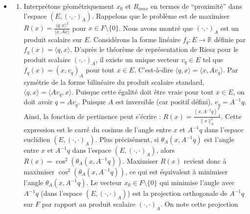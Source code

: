 \documentclass[11pt,a4paper]{report}
\begin{document}
\begin{enumerate}
\begin{itemize}
\begin{enumerate}
    \item
      Calculons la valeur maximale \(R_{max}\) de \(R(x)\). La valeur
      maximale de \(R'(y)\) est \(\|P_{F'}(q')\|^2\). Donc,
      \(R_{max} = \|P_{F'}(q')\|^2\). En substituant \(q' = A^{-1/2}q\)
      et \(F' = A^{1/2}(F)\) :
      \(R_{max} = \|P_{A^{1/2}(F)}(A^{-1/2}q)\|^2\).
    \end{enumerate}
  \item
    \begin{enumerate}
    \def\labelenumii{\alph{enumii})}
    \setcounter{enumii}{3}

    \item
      Interprétons géométriquement \(x_0\) et \(R_{max}\) en termes de
      ``proximité'' dans l'espace \((E, (\cdot, \cdot)_A)\). Rappelons
      que le problème est de maximiser
      \(R(x) = \frac{\langle q, x \rangle^2}{\langle x, Ax \rangle}\)
      pour \(x \in F \setminus \{0\}\). Nous avons montré que
      \((\cdot, \cdot)_A\) est un produit scalaire sur \(E\).
      Considérons la forme linéaire \(f_q: E \to \mathbb{R}\) définie
      par \(f_q(x) = \langle q, x \rangle\). D'après le théorème de
      représentation de Riesz pour le produit scalaire
      \((\cdot, \cdot)_A\), il existe un unique vecteur \(v_q \in E\)
      tel que \(f_q(x) = (x, v_q)_A\) pour tout \(x \in E\).
      C'est-à-dire \(\langle q, x \rangle = \langle x, Av_q \rangle\).
      Par symétrie de la forme bilinéaire du produit scalaire standard,
      \(\langle q, x \rangle = \langle Av_q, x \rangle\). Puisque cette
      égalité doit être vraie pour tout \(x \in E\), on doit avoir
      \(q = Av_q\). Puisque \(A\) est inversible (car positif défini),
      \(v_q = A^{-1}q\). Ainsi, la fonction de pertinence peut s'écrire
      : \(R(x) = \frac{(x, A^{-1}q)_A^2}{\|x\|_A^2}\). Cette expression
      est le carré du cosinus de l'angle entre \(x\) et \(A^{-1}q\) dans
      l'espace euclidien \((E, (\cdot, \cdot)_A)\). Plus précisément, si
      \(\theta_A(x, A^{-1}q)\) est l'angle entre \(x\) et \(A^{-1}q\)
      dans l'espace \((E, (\cdot, \cdot)_A)\), alors
      \(R(x) = \cos^2(\theta_A(x, A^{-1}q))\). Maximiser \(R(x)\)
      revient donc à maximiser \(\cos^2(\theta_A(x, A^{-1}q))\), ce qui
      est équivalent à minimiser l'angle \(\theta_A(x, A^{-1}q)\). Le
      vecteur \(x_0 \in F \setminus \{0\}\) qui minimise l'angle avec
      \(A^{-1}q\) (dans l'espace \((E, (\cdot, \cdot)_A)\)) est la
      projection orthogonale de \(A^{-1}q\) sur \(F\) par rapport au
      produit scalaire \((\cdot, \cdot)_A\). On note cette projection

\end{enumerate}
\end{itemize}
\end{enumerate}
\end{document}
